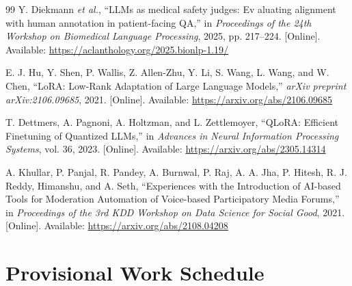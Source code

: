 \documentclass[11pt,a4paper]{article}
\begin{document}
\begin{thebibliography}{99}
Y. Diekmann \emph{et al.},
``LLMs as medical safety judges: Ev                                                                                                                                                                                                                                                                                                                                                                                                                                                                                                                                                                                                                                                                                                                                                                                                                                                                        aluating alignment with human
annotation in patient-facing QA,''
in \emph{Proceedings of the 24th Workshop on Biomedical Language
Processing}, 2025, pp. 217--224.
[Online]. Available:
\url{https://aclanthology.org/2025.bionlp-1.19/}


E. J. Hu, Y. Shen, P. Wallis, Z. Allen-Zhu, Y. Li, S. Wang,
L. Wang, and W. Chen,
``LoRA: Low-Rank Adaptation of Large Language Models,''
\emph{arXiv preprint arXiv:2106.09685}, 2021.
[Online]. Available: \url{https://arxiv.org/abs/2106.09685}

T. Dettmers, A. Pagnoni, A. Holtzman, and L. Zettlemoyer,
``QLoRA: Efficient Finetuning of Quantized LLMs,''
in \emph{Advances in Neural Information Processing Systems},
vol. 36, 2023.
[Online]. Available: \url{https://arxiv.org/abs/2305.14314}


A. Khullar, P. Panjal, R. Pandey, A. Burnwal, P. Raj,
A. A. Jha, P. Hitesh, R. J. Reddy, Himanshu, and A. Seth,
``Experiences with the Introduction of AI-based Tools for Moderation
Automation of Voice-based Participatory Media Forums,''
in \emph{Proceedings of the 3rd KDD Workshop on Data Science for Social Good},
2021.
[Online]. Available: \url{https://arxiv.org/abs/2108.04208}

\end{thebibliography}

\appendix
\section{Provisional Work Schedule}
\label{app:work-schedule}
\end{document}
